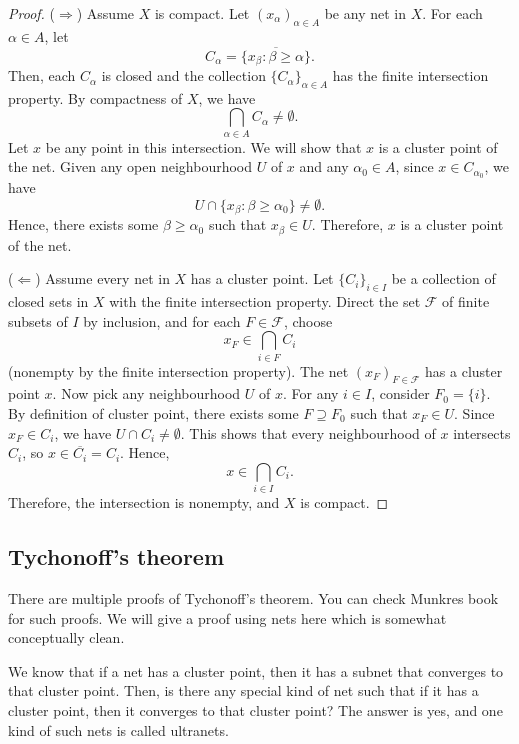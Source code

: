 \begin{proof}
    (\(\Rightarrow\)) Assume \(X\) is compact. Let \((x_\alpha)_{\alpha \in A}\) be any net in \(X\). For each \(\alpha \in A\), let 
    \[
        C_\alpha = \overline{\{x_\beta : \beta \geq \alpha\}}.
    \]
    Then, each \(C_\alpha\) is closed and the collection \(\{C_\alpha\}_{\alpha \in A}\) has the finite intersection property. By compactness of \(X\), we have 
    \[
        \bigcap_{\alpha \in A} C_\alpha \neq \emptyset.
    \]
    Let \(x\) be any point in this intersection. We will show that \(x\) is a cluster point of the net. Given any open neighbourhood \(U\) of \(x\) and any \(\alpha_0 \in A\), since \(x \in C_{\alpha_0}\), we have 
    \[
        U \cap \{x_\beta : \beta \geq \alpha_0\} \neq \emptyset.
    \]
    Hence, there exists some \(\beta \geq \alpha_0\) such that \(x_\beta \in U\). Therefore, \(x\) is a cluster point of the net.

    (\(\Leftarrow\)) Assume every net in \(X\) has a cluster point. Let \(\{C_i\}_{i\in I}\) be a collection of closed sets in \(X\) with the finite intersection property. Direct the set \(\mathcal{F}\) of finite subsets of \(I\) by inclusion, and for each \(F \in \mathcal{F}\), choose 
    \[
        x_F \in \bigcap_{i \in F} C_i
    \]
    (nonempty by the finite intersection property). The net \((x_F)_{F \in \mathcal{F}}\) has a cluster point \(x\). Now pick any neighbourhood \(U\) of \(x\). For any \(i \in I\), consider \(F_0 = \{i\}\). By definition of cluster point, there exists some \(F \supseteq F_0\) such that \(x_F \in U\). Since \(x_F \in C_i\), we have \(U \cap C_i \neq \emptyset\). This shows that every neighbourhood of \(x\) intersects \(C_i\), so \(x \in \overline{C_i} = C_i\). Hence, 
    \[
        x \in \bigcap_{i \in I} C_i.
    \]
    Therefore, the intersection is nonempty, and \(X\) is compact.
\end{proof}






\subsection{Tychonoff's theorem}

There are multiple proofs of Tychonoff's theorem. You can check Munkres book for such proofs. We will give a proof using nets here which is somewhat conceptually clean.

We know that if a net has a cluster point, then it has a subnet that converges to that cluster point. Then, is there any special kind of net such that if it has a cluster point, then it converges to that cluster point? The answer is yes, and one kind of such nets is called ultranets.

